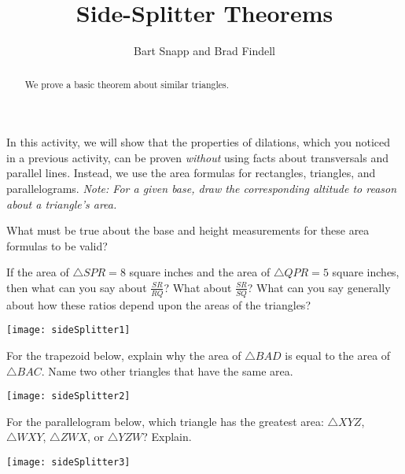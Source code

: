 \documentclass[nooutcomes]{ximera}
\title{Side-Splitter Theorems}
\author{Bart Snapp and Brad Findell}
\begin{document}
\begin{abstract}
  We prove a basic theorem about similar triangles.
\end{abstract}
\maketitle

\begin{teachingnote}
\end{teachingnote}

In this activity, we will show that the properties of dilations, which you noticed in a previous activity, can be proven \emph{without} using facts about transversals and parallel lines.  Instead, we use the area formulas for rectangles, triangles, and 
parallelograms.  \emph{Note: For a given base, draw the corresponding altitude to reason about a triangle's area.}
\begin{question}
What must be true about the base and height measurements for these area formulas to be valid?
\end{question}

\begin{problem}
If the area of $\triangle SPR = 8$ square inches and the area of $\triangle QPR = 5$ square inches, then what can you say about $\frac{SR}{RQ}$?  What about $\frac{SR}{SQ}$?  What can you say generally about how these ratios depend upon the areas of the triangles?  
\begin{image}
\texttt{[image: sideSplitter1]}
\end{image}
\end{problem}

\begin{problem}
For the trapezoid below, explain why the area of $\triangle BAD$ is equal to the area of $\triangle BAC$.  Name two other triangles that have the same area.
\begin{image}
\texttt{[image: sideSplitter2]}
\end{image}
\end{problem}

\begin{problem}
For the parallelogram below, which triangle has the greatest area: $\triangle XYZ$, $\triangle WXY$, $\triangle ZWX$, or $\triangle YZW$?  Explain.  
\begin{image}
\texttt{[image: sideSplitter3]}
\end{image}
\end{problem}
\end{document}
